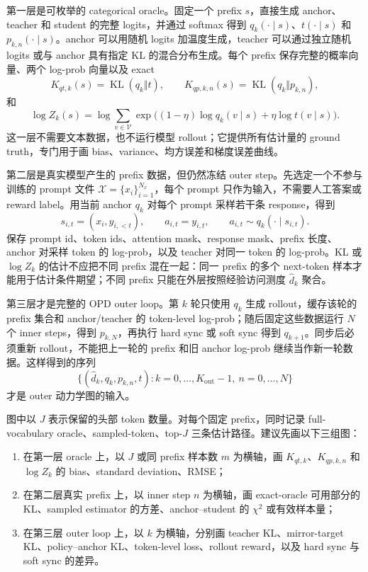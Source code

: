 \documentclass[lang=cn,scheme=chinese,openany]{../book/elegantbook}
\begin{document}
第一层是可枚举的 categorical oracle。固定一个 prefix $s$，直接生成 anchor、teacher 和 student 的完整 logits，并通过 softmax 得到 $q_k(\cdot\mid s)$、$t(\cdot\mid s)$ 和 $p_{k,n}(\cdot\mid s)$。anchor 可以用随机 logits 加温度生成，teacher 可以通过独立随机 logits 或与 anchor 具有指定 KL 的混合分布生成。每个 prefix 保存完整的概率向量、两个 log-prob 向量以及 exact
\begin{equation}
K_{qt,k}(s)=\operatorname{KL}(q_k\Vert t),\qquad K_{qp,k,n}(s)=\operatorname{KL}(q_k\Vert p_{k,n}),
\end{equation}
和
\begin{equation}
\log Z_k(s)=\log\sum_{v\in\mathcal V}\exp\bigl((1-\eta)\log q_k(v\mid s)+\eta\log t(v\mid s)\bigr).
\end{equation}
这一层不需要文本数据，也不运行模型 rollout；它提供所有估计量的 ground truth，专门用于画 bias、variance、均方误差和梯度误差曲线。

第二层是真实模型产生的 prefix 数据，但仍然冻结 outer step。先选定一个不参与训练的 prompt 文件 $\mathcal X=\{x_i\}_{i=1}^{N_x}$，每个 prompt 只作为输入，不需要人工答案或 reward label。用当前 anchor $q_k$ 对每个 prompt 采样若干条 response，得到
\begin{equation}
s_{i,t}=(x_i,y_{i,<t}),\qquad a_{i,t}=y_{i,t},\qquad a_{i,t}\sim q_k(\cdot\mid s_{i,t}).
\end{equation}
保存 prompt id、token ids、attention mask、response mask、prefix 长度、anchor 对采样 token 的 log-prob，以及 teacher 对同一 token 的 log-prob。KL 或 $\log Z_k$ 的估计不应把不同 prefix 混在一起：同一 prefix 的多个 next-token 样本才能用于估计条件期望；不同 prefix 只能在外层按照经验访问测度 $\widehat d_k$ 聚合。

第三层才是完整的 OPD outer loop。第 $k$ 轮只使用 $q_k$ 生成 rollout，缓存该轮的 prefix 集合和 anchor/teacher 的 token-level log-prob；随后固定这些数据运行 $N$ 个 inner steps，得到 $p_{k,N}$，再执行 hard sync 或 soft sync 得到 $q_{k+1}$。同步后必须重新 rollout，不能把上一轮的 prefix 和旧 anchor log-prob 继续当作新一轮数据。这样得到的序列
\begin{equation}
\{(\widehat d_k,q_k,p_{k,n},t): k=0,\ldots,K_{\mathrm{out}}-1,\ n=0,\ldots,N\}
\end{equation}
才是 outer 动力学图的输入。

图中以 $J$ 表示保留的头部 token 数量。对每个固定 prefix，同时记录 full-vocabulary oracle、sampled-token、top-$J$ 三条估计路径。建议先画以下三组图：

\begin{enumerate}
\item 在第一层 oracle 上，以 $J$ 或同 prefix 样本数 $m$ 为横轴，画 $K_{qt,k}$、$K_{qp,k,n}$ 和 $\log Z_k$ 的 bias、standard deviation、RMSE；
\item 在第二层真实 prefix 上，以 inner step $n$ 为横轴，画 exact-oracle 可用部分的 KL、sampled estimator 的方差、anchor--student 的 $\chi^2$ 或有效样本量；
\item 在第三层 outer loop 上，以 $k$ 为横轴，分别画 teacher KL、mirror-target KL、policy--anchor KL、token-level loss、rollout reward，以及 hard sync 与 soft sync 的差异。
\end{enumerate}
\end{document}
